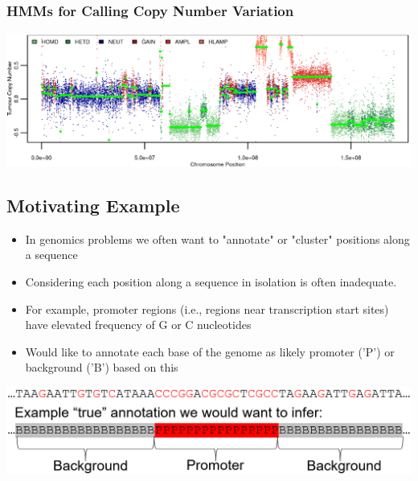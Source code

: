 \documentclass[10pt]{article}
\begin{document}
\subsubsection*{HMMs for Calling Copy Number Variation}
\begin{center} 
	\includegraphics*[width=\textwidth]{W9_5.png} 
\end{center}

\subsection*{Motivating Example}
\begin{itemize}
	\item In genomics problems we often want to "annotate" or "cluster" positions along a sequence
	\item Considering each position along a sequence in isolation is often inadequate.
	\item For example, promoter regions (i.e., regions near transcription start sites) have elevated frequency of G or C nucleotides
	\item Would like to annotate each base of the genome as likely promoter ('P') or background ('B') based on this
\end{itemize}
\begin{center} 
	\includegraphics*[width=\textwidth]{W9_6.png} 
\end{center}
\end{document}

